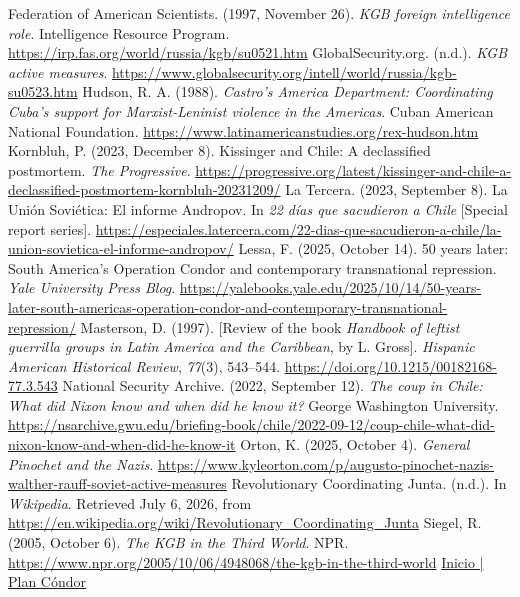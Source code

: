 
\begin{referencelist}
   Federation of American Scientists. (1997, November 26). \emph{KGB foreign intelligence role}. Intelligence Resource Program. \url{https://irp.fas.org/world/russia/kgb/su0521.htm}
   GlobalSecurity.org. (n.d.). \emph{KGB active measures}. \url{https://www.globalsecurity.org/intell/world/russia/kgb-su0523.htm}
   Hudson, R. A. (1988). \emph{Castro's America Department: Coordinating Cuba's support for Marxist-Leninist violence in the Americas}. Cuban American National Foundation. \url{https://www.latinamericanstudies.org/rex-hudson.htm}
   Kornbluh, P. (2023, December 8). Kissinger and Chile: A declassified postmortem. \emph{The Progressive}. \url{https://progressive.org/latest/kissinger-and-chile-a-declassified-postmortem-kornbluh-20231209/}
   La Tercera. (2023, September 8). La Unión Soviética: El informe Andropov. In \emph{22 días que sacudieron a Chile} [Special report series]. \url{https://especiales.latercera.com/22-dias-que-sacudieron-a-chile/la-union-sovietica-el-informe-andropov/}
   Lessa, F. (2025, October 14). 50 years later: South America's Operation Condor and contemporary transnational repression. \emph{Yale University Press Blog}. \url{https://yalebooks.yale.edu/2025/10/14/50-years-later-south-americas-operation-condor-and-contemporary-transnational-repression/}
   Masterson, D. (1997). [Review of the book \emph{Handbook of leftist guerrilla groups in Latin America and the Caribbean}, by L. Gross]. \emph{Hispanic American Historical Review}, \emph{77}(3), 543–544. \url{https://doi.org/10.1215/00182168-77.3.543}
   National Security Archive. (2022, September 12). \emph{The coup in Chile: What did Nixon know and when did he know it?} George Washington University. \url{https://nsarchive.gwu.edu/briefing-book/chile/2022-09-12/coup-chile-what-did-nixon-know-and-when-did-he-know-it}
   Orton, K. (2025, October 4). \emph{General Pinochet and the Nazis}. \url{https://www.kyleorton.com/p/augusto-pinochet-nazis-walther-rauff-soviet-active-measures}
   Revolutionary Coordinating Junta. (n.d.). In \emph{Wikipedia}. Retrieved July 6, 2026, from \url{https://en.wikipedia.org/wiki/Revolutionary_Coordinating_Junta}
   Siegel, R. (2005, October 6). \emph{The KGB in the Third World}. NPR. \url{https://www.npr.org/2005/10/06/4948068/the-kgb-in-the-third-world}
   \href{https://plancondor.org/en}{Inicio | Plan Cóndor}
\end{referencelist}
